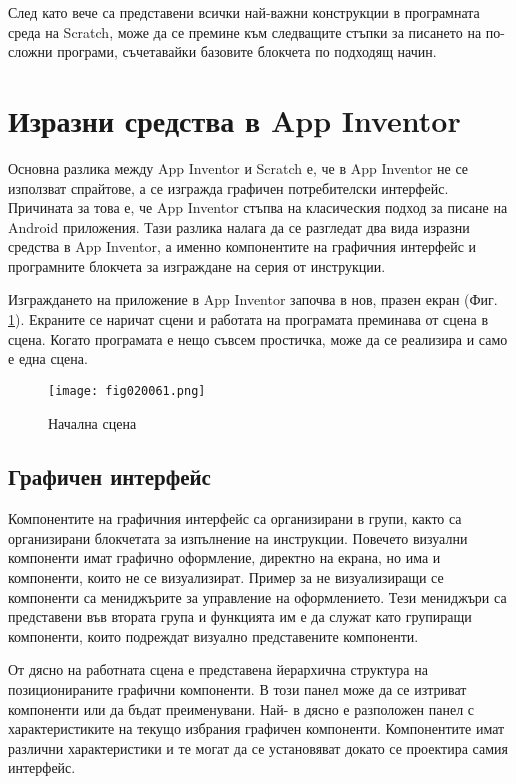 След като вече са представени всички най-важни конструкции в програмната среда на Scratch, може да се премине към следващите стъпки за писането на по-сложни програми, съчетавайки базовите блокчета по подходящ начин.

\section{Изразни средства в App Inventor}

Основна разлика между App Inventor и Scratch е, че в App Inventor не се използват спрайтове, а се изгражда графичен потребителски интерфейс. Причината за това е, че App Inventor стъпва на класическия подход за писане на Android приложения. Тази разлика налага да се разгледат два вида изразни средства в App Inventor, а именно компонентите на графичния интерфейс и програмните блокчета за изграждане на серия от инструкции.

Изграждането на приложение в App Inventor започва в нов, празен екран (Фиг. \ref{fig020061}). Екраните се наричат сцени и работата на програмата преминава от сцена в сцена. Когато програмата е нещо съвсем простичка, може да се реализира и само е една сцена. 

\begin{figure}[H]
  \centering
  \texttt{[image: fig020061.png]}
  \caption{Начална сцена}
\label{fig020061}
\end{figure}

\subsection{Графичен интерфейс}

Компонентите на графичния интерфейс са организирани в групи, както са организирани блокчетата за изпълнение на инструкции. Повечето визуални компоненти имат графично оформление, директно на екрана, но има и компоненти, които не се визуализират. Пример за не визуализиращи се компоненти са мениджърите за управление на оформлението. Тези мениджъри са представени във втората група и функцията им е да служат като групиращи компоненти, които подреждат визуално представените компоненти. 

От дясно на работната сцена е представена йерархична структура на позиционираните графични компоненти. В този панел може да се изтриват компоненти или да бъдат преименувани. Най- в дясно е разположен панел с характеристиките на текущо избрания графичен компоненти. Компонентите имат различни характеристики и те могат да се установяват докато се проектира самия интерфейс. 

